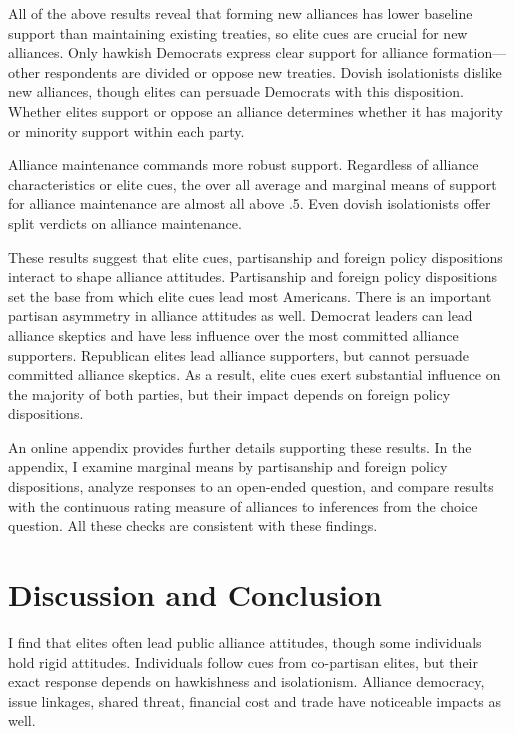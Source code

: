 \documentclass[12pt]{article}
\begin{document}
All of the above results reveal that forming new alliances has lower baseline support than maintaining existing treaties, so elite cues are crucial for new alliances. 
Only hawkish Democrats express clear support for alliance formation--- other respondents are divided or oppose new treaties.
Dovish isolationists dislike new alliances, though elites can persuade Democrats with this disposition. 
Whether elites support or oppose an alliance determines whether it has majority or minority support within each party. 


Alliance maintenance commands more robust support. 
Regardless of alliance characteristics or elite cues, the over all average and marginal means of support for alliance maintenance are almost all above .5. 
Even dovish isolationists offer split verdicts on alliance maintenance.


These results suggest that elite cues, partisanship and foreign policy dispositions interact to shape alliance attitudes.
Partisanship and foreign policy dispositions set the base from which elite cues lead most Americans. 
There is an important partisan asymmetry in alliance attitudes as well. 
Democrat leaders can lead alliance skeptics and have less influence over the most committed alliance supporters. 
Republican elites lead alliance supporters, but cannot persuade committed alliance skeptics. 
As a result, elite cues exert substantial influence on the majority of both parties, but their impact depends on foreign policy dispositions. 


An online appendix provides further details supporting these results. 
In the appendix, I examine marginal means by partisanship and foreign policy dispositions, analyze responses to an open-ended question, and compare results with the continuous rating measure of alliances to inferences from the choice question.
All these checks are consistent with these findings. 


\section{Discussion and Conclusion} 


I find that elites often lead public alliance attitudes, though some individuals hold rigid attitudes. 
Individuals follow cues from co-partisan elites, but their exact response depends on hawkishness and isolationism. 
Alliance democracy, issue linkages, shared threat, financial cost and trade have noticeable impacts as well.  
\end{document}
